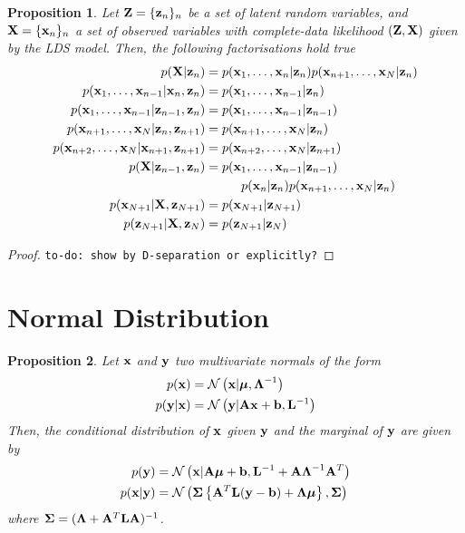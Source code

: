 \documentclass[11pt]{article}
\numberwithin{equation}{section}
\newcommand{\x}{{\bf x}}
\newcommand{\z}{{\bf z}}
\newtheorem{proposition}{Proposition}[section]
\begin{document}
\begin{proposition} \label{prop:graphical-models-separation}
	Let ${\bf Z} = \{\z_n\}_n$ be a set of latent random variables, and ${\bf X} = \{\x_n\}_n$ a set of observed variables with complete-data likelihood $({\bf Z}, {\bf X})$ given by the LDS model. Then, the following factorisations hold true
	\begin{align}
		p({\bf X}\vert\z_n) &= p({\x_1, \ldots, \x_n \vert \z_n})p({\x_{n+1}, \ldots, \x_N \vert \z_n}) \label{gm:1}\\
		p(\x_1, \ldots, \x_{n-1}\vert \x_n, \z_n) &= p(\x_1, \ldots, \x_{n-1}\vert \z_n)\\
		p(\x_1, \ldots, \x_{n-1}\vert \z_{n-1}, \z_{n}) &= p(\x_1, \ldots, \x_{n-1}\vert \z_{n-1})\\
		p(\x_{n+1}, \ldots, \x_N \vert \z_n, \z_{n+1}) &= p(\x_{n+1}, \ldots, \x_N \vert \z_n)\\
		p(\x_{n+2}, \ldots, \x_N\vert \x_{n+1}, \z_{n+1}) &= p(\x_{n+2}, \ldots, \x_N \vert \z_{n+1})\\
		p({\bf X}\vert \z_{n-1}, \z_{n}) &= p(\x_1, \ldots, \x_{n-1}\vert \z_{n-1}) \nonumber\\
			&\hspace{1cm}p(\x_n\vert \z_n) p(\x_{n+1}, \ldots, \x_N \vert \z_n)\\
		p(\x_{N+1} \vert {\bf X}, \z_{N+1}) &= p(\x_{N+1} \vert \z_{N+1})\\
		p(\z_{N+1} \vert {\bf X}, \z_{N}) &= p(\z_{N+1} \vert \z_{N})\\
	\end{align}
\end{proposition}

\begin{proof}
	\texttt{to-do: show by D-separation or explicitly?}
\end{proof}

\section{Normal Distribution}
\begin{proposition}
	Let $\x$ and ${\bf y}$ two multivariate normals of the form
	\begin{align}
		p(\x) &= \mathcal{N}\left(\x \vert \boldsymbol\mu, \boldsymbol\Lambda^{-1}\right)\\
		p({\bf y} \vert \x ) &= \mathcal{N}\left({\bf y} \vert {\bf A}\x + {\bf b}, {\bf L}^{-1}\right)
	\end{align}
	Then, the conditional distribution of $\x$ given ${\bf y}$ and the marginal of ${\bf y}$ are given by
	\begin{align}
		p({\bf y}) &= \mathcal{N}\left(\x\vert {\bf A}\boldsymbol\mu + {\bf b}, {\bf L}^{-1} + {\bf A}\boldsymbol\Lambda^{-1}{\bf A}^T\right) \label{eq:normal-marginal}\\
		p(\x \vert {\bf y}) &= \mathcal{N}\left(\boldsymbol\Sigma\left\{{\bf A}^T {\bf L}({\bf y} - {\bf b})  + \boldsymbol\Lambda\boldsymbol\mu \right\}, \boldsymbol\Sigma\right) \label{eq:normal-conditional}
	\end{align}
	where $\boldsymbol{\Sigma} = (\boldsymbol\Lambda + {\bf A}^T {\bf L} {\bf A})^{-1}$.
\end{proposition}
\end{document}
